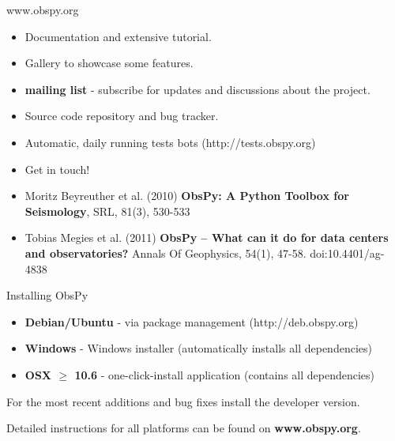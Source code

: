 \documentclass[handout]{beamer}
\begin{document}
\begin{frame}[plain]{www.obspy.org}
    \begin{itemize}
        \item Documentation and extensive tutorial.
        \item Gallery to showcase some features.
        \item \textbf{mailing list} - subscribe for updates and discussions about the project.
        \item Source code repository and bug tracker.
        \item Automatic, daily running tests bots (http://tests.obspy.org)
        \item Get in touch!
    \end{itemize}

    \vspace{2em}

    \small
    \begin{itemize}
        \item Moritz Beyreuther et al. (2010) \textbf{ObsPy: A Python Toolbox for Seismology}, SRL, 81(3), 530-533
        \item Tobias Megies et al. (2011) \textbf{ObsPy – What can it do for data centers and observatories?} Annals Of Geophysics, 54(1), 47-58. doi:10.4401/ag-4838 
    \end{itemize}
\end{frame}


\begin{frame}[plain]{Installing ObsPy}
    \begin{itemize}
        \item \textbf{Debian/Ubuntu} - via package management (http://deb.obspy.org)
        \item \textbf{Windows} - Windows installer (automatically installs all dependencies)
        \item \textbf{OSX $\ge$ 10.6} - one-click-install application (contains all dependencies)
    \end{itemize}
    For the most recent additions and bug fixes install the developer version.
    
    \vspace{2em}

    Detailed instructions for all platforms can be found on \textbf{www.obspy.org}.
\end{frame}
\end{document}
